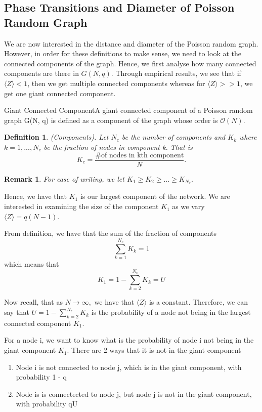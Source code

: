 \documentclass[twoside]{article}
\newtheorem{definition}[theorem]{Definition}
\newtheorem{remark}[theorem]{Remark}
\begin{document}
\subsection{Phase Transitions and Diameter of Poisson Random Graph}
We are now interested in the distance and diameter of the Poisson random graph. However, in order for these definitions to make sense, we need to look at the connected components of the graph. Hence, we first analyse how many connected components are there in $G(N,q).$ Through empirical results, we see that if $\langle Z \rangle < 1$, then we get multiple connected components whereas for $\langle Z \rangle >> 1$, we get one giant connected component.

\begin{definition_exam}{Giant Connected Component}{}A giant connected component of a Poisson random graph G(N, q) is defined as a component of the graph whose order is $\mathcal{O}(N).$
\end{definition_exam}

\begin{definition}(Components). Let $N_c$ be the number of components and $K_{k}$ where $k = 1,...,N_c$ be the fraction of nodes in component k. That is 
$$
K_c = \frac{\text{\# of nodes in kth component}}{N}.
$$
\end{definition}

\begin{remark}For ease of writing, we let $K_1 \geq K_2 \geq ... \geq K_{N_{c}}.$
\end{remark}

Hence, we have that $K_1$ is our largest component of the network. We are interested in examining the size of the component $K_1$ as we vary $\langle Z \rangle = q(N - 1).$

From definition, we have that the sum of the fraction of components 
$$
\sum_{k=1}^{N_{c}}K_k = 1
$$
which means that 
$$
K_1 = 1 - \sum_{k=2}^{N_{c}}K_k = U
$$

Now recall, that as $N \rightarrow \infty,$ we have that $\langle Z \rangle$ is a constant. Therefore, we can say that $U = 1 - \sum_{k=2}^{N_{c}}K_k$ is the probability of a node not being in the largest connected component $K_1$.

For a node i, we want to know what is the probability of node i not being in the giant component $K_1.$ There are 2 ways that it is not in the giant component 
\begin{enumerate}
\item Node i is not connected to node j, which is in the giant component, with probability 1 - q
\item Node is is connectected to node j, but node j is not in the giant component, with probability qU
\end{enumerate}
\end{document}
